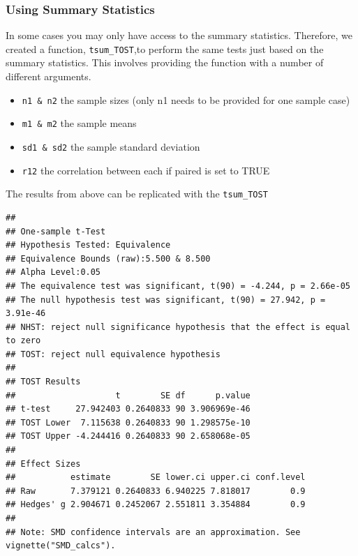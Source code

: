 \documentclass[]{interact}
\theoremstyle{plain}%
\theoremstyle{definition}
\theoremstyle{remark}
\newenvironment{Shaded}{\begin{snugshade}}{\end{snugshade}}
\newcommand{\AttributeTok}[1]{\textcolor[rgb]{0.77,0.63,0.00}{#1}}
\newcommand{\ConstantTok}[1]{\textcolor[rgb]{0.00,0.00,0.00}{#1}}
\newcommand{\FloatTok}[1]{\textcolor[rgb]{0.00,0.00,0.81}{#1}}
\newcommand{\FunctionTok}[1]{\textcolor[rgb]{0.00,0.00,0.00}{#1}}
\newcommand{\NormalTok}[1]{#1}
\newcommand{\OtherTok}[1]{\textcolor[rgb]{0.56,0.35,0.01}{#1}}
\newcommand{\SpecialCharTok}[1]{\textcolor[rgb]{0.00,0.00,0.00}{#1}}
\newcommand{\StringTok}[1]{\textcolor[rgb]{0.31,0.60,0.02}{#1}}
\providecommand{\tightlist}{%
  \setlength{\itemsep}{0pt}\setlength{\parskip}{0pt}}
\def\tightlist{}
\begin{document}
\hypertarget{using-summary-statistics}{%
\subsubsection{Using Summary
Statistics}\label{using-summary-statistics}}

In some cases you may only have access to the summary statistics.
Therefore, we created a function, \texttt{tsum\_TOST},to perform the
same tests just based on the summary statistics. This involves providing
the function with a number of different arguments.

\begin{itemize}
\tightlist
\item
  \texttt{n1\ \&\ n2} the sample sizes (only n1 needs to be provided for
  one sample case)
\item
  \texttt{m1\ \&\ m2} the sample means
\item
  \texttt{sd1\ \&\ sd2} the sample standard deviation
\item
  \texttt{r12} the correlation between each if paired is set to TRUE
\end{itemize}

The results from above can be replicated with the \texttt{tsum\_TOST}

\begin{Shaded}
\end{Shaded}

\begin{verbatim}
## 
## One-sample t-Test
## Hypothesis Tested: Equivalence
## Equivalence Bounds (raw):5.500 & 8.500
## Alpha Level:0.05
## The equivalence test was significant, t(90) = -4.244, p = 2.66e-05
## The null hypothesis test was significant, t(90) = 27.942, p = 3.91e-46
## NHST: reject null significance hypothesis that the effect is equal to zero 
## TOST: reject null equivalence hypothesis
## 
## TOST Results 
##                    t        SE df      p.value
## t-test     27.942403 0.2640833 90 3.906969e-46
## TOST Lower  7.115638 0.2640833 90 1.298575e-10
## TOST Upper -4.244416 0.2640833 90 2.658068e-05
## 
## Effect Sizes 
##           estimate        SE lower.ci upper.ci conf.level
## Raw       7.379121 0.2640833 6.940225 7.818017        0.9
## Hedges' g 2.904671 0.2452067 2.551811 3.354884        0.9
## 
## Note: SMD confidence intervals are an approximation. See vignette("SMD_calcs").
\end{verbatim}
\end{document}
